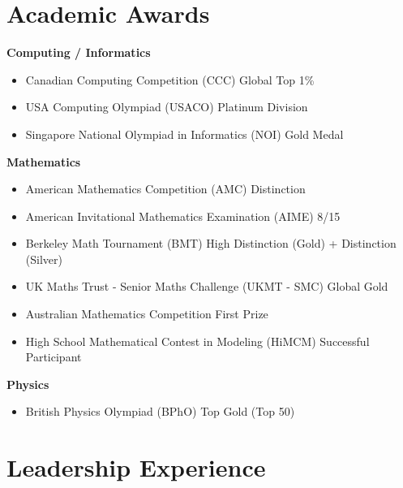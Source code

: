 \documentclass[10pt, letterpaper]{article}
\newenvironment{highlights}{
    \begin{itemize}[
        topsep=0.10 cm,
        parsep=0.10 cm,
        partopsep=0pt,
        itemsep=0pt,
        leftmargin=0.4 cm + 10pt
    ]
}{
    \end{itemize}
} %
\begin{document}
    \section{Academic Awards}

    
    \textbf{Computing / Informatics}

    \begin{highlights}
        \item Canadian Computing Competition (CCC) \hfill Global Top 1\%

        \item USA Computing Olympiad (USACO) \hfill Platinum Division
        
        \item Singapore National Olympiad in Informatics (NOI) \hfill Gold Medal
    \end{highlights}

    \textbf{Mathematics}
    
    \begin{highlights}
        \item American Mathematics Competition (AMC) \hfill Distinction

        \item American Invitational Mathematics Examination (AIME) \hfill 8/15

        \item Berkeley Math Tournament (BMT) \hfill High Distinction (Gold) + Distinction (Silver)

        \item UK Maths Trust - Senior Maths Challenge (UKMT - SMC) \hfill Global Gold

        \item Australian Mathematics Competition \hfill First Prize

        \item High School Mathematical Contest in Modeling (HiMCM) \hfill Successful Participant
    \end{highlights}
    
    \textbf{Physics}

    \begin{highlights}
        \item British Physics Olympiad (BPhO) \hfill Top Gold (Top 50)
    \end{highlights}


    \section{Leadership Experience}
    
\end{document}
